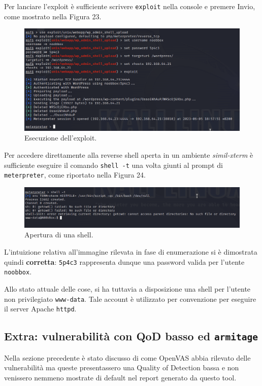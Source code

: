 \documentclass[a4paper, 12pt, oneside]{article}
\begin{document}
Per lanciare l'exploit è sufficiente scrivere \texttt{exploit} nella console e premere Invio, come mostrato nella Figura 23.

\begin{figure}[h!]
    \centering
    \includegraphics[width=\textwidth]{img/metaspolit_exploit.png}
    \caption{Esecuzione dell'exploit.}
\end{figure}

\newpage

Per accedere direttamente alla reverse shell aperta in un ambiente \textit{simil-xterm} è sufficiente eseguire il comando \texttt{shell -t} una volta giunti al prompt di \texttt{meterpreter}, come riportato nella Figura 24.

\begin{figure}[h!]
    \centering
    \includegraphics[width=\textwidth]{img/meterpreter-shell.png}
    \caption{Apertura di una shell.}
\end{figure}

L'intuizione relativa all'immagine rilevata in fase di enumerazione si è dimostrata quindi \textbf{corretta}: \texttt{5p4c3} rappresenta dunque una password valida per l'utente \texttt{noobbox}.

Allo stato attuale delle cose, si ha tuttavia a disposizione una shell per l'utente non privilegiato \texttt{www-data}. Tale account è utilizzato per convenzione per eseguire il server Apache \texttt{httpd}\cite{www-data}.

\subsection{Extra: vulnerabilità con QoD basso ed \texttt{armitage}}
Nella sezione precedente è stato discusso di come OpenVAS abbia rilevato delle vulnerabilità ma queste presentassero una Quality of Detection bassa e non venissero nemmeno mostrate di default nel report generato da questo tool. 
\end{document}
